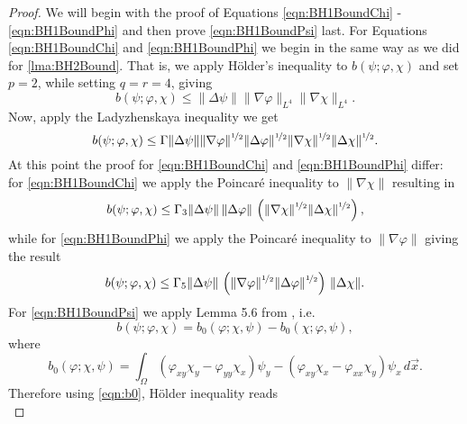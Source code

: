 \begin{proof}
  We will begin with the proof of Equations \eqref{eqn:BH1BoundChi} -
  \eqref{eqn:BH1BoundPhi} and then prove \autoref{eqn:BH1BoundPsi} last. For
  Equations \eqref{eqn:BH1BoundChi} and \eqref{eqn:BH1BoundPhi} we begin in
  the same way as we did for \autoref{lma:BH2Bound}. That is, we apply
  H\"older's inequality to $b(\psi; \varphi, \chi)$ and set $p=2$, while setting
  $q=r=4$, giving
  \begin{equation*}
    b(\psi;\varphi,\chi) \le \|\Delta \psi\| \|\nabla \varphi\|_{L^4} \|\nabla
      \chi\|_{L^4}.
  \end{equation*}
  Now, apply the Ladyzhenskaya inequality we get
  \begin{equation*}
    b(\psi;\varphi,\chi) \le \Gamma \|\Delta \psi\|
      \|\nabla \varphi\|^{\nicefrac{1}{2}} \|\Delta \varphi\|^{\nicefrac{1}{2}}
      \|\nabla \chi\|^{\nicefrac{1}{2}} \|\Delta \chi\|^{\nicefrac{1}{2}}.
  \end{equation*}
  At this point the proof for \eqref{eqn:BH1BoundChi} and \eqref{eqn:BH1BoundPhi}
  differ: for \eqref{eqn:BH1BoundChi} we apply the Poincar\'e inequality to
  $\|\nabla \chi\|$ resulting in
  \begin{equation*}
    b(\psi;\varphi,\chi) \le \Gamma_3 \|\Delta \psi\|\, \|\Delta \varphi\|\,
      \left(\|\nabla \chi\|^{\nicefrac{1}{2}}
      \|\Delta \chi\|^{\nicefrac{1}{2}}\right),
  \end{equation*}
  while for \eqref{eqn:BH1BoundPhi} we apply the Poincar\'e inequality to
  $\|\nabla \varphi\|$ giving the result
  \begin{equation}
    b(\psi;\varphi,\chi) \le \Gamma_5 \|\Delta \psi\|\,
      \left(\|\nabla \varphi\|^{\nicefrac{1}{2}}
      \|\Delta \varphi\|^{\nicefrac{1}{2}}\right)\, \|\Delta \chi\|.
    \label{eqn:b0}
  \end{equation}
  For \autoref{eqn:BH1BoundPsi} we apply Lemma 5.6 from \cite{Fairag98}, i.e.
  \begin{equation*}
    b(\psi; \varphi, \chi) = b_0(\varphi; \chi, \psi) - b_0(\chi; \varphi, \psi),
  \end{equation*}
  where
  \begin{equation*}
    b_0(\varphi;\chi,\psi) = \int_{\Omega}\!
      (\varphi_{xy} \chi_y - \varphi_{yy} \chi_x) \psi_y
      - (\varphi_{xy} \chi_x - \varphi_{xx} \chi_y) \psi_x \, d\vec{x}.
  \end{equation*}
  Therefore using \eqref{eqn:b0}, H\"older inequality reads
  \begin{equation}

\end{equation}
\end{proof}
